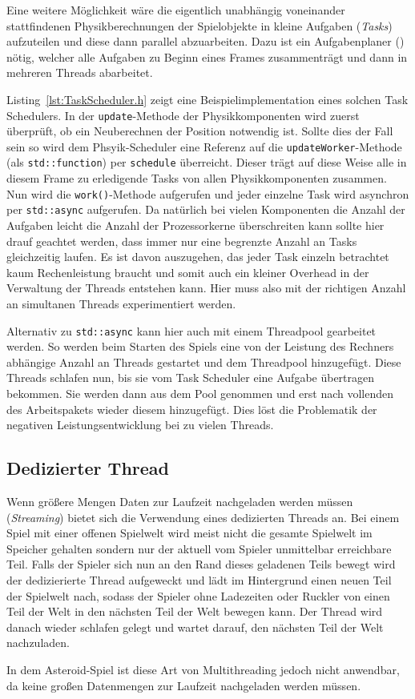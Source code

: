 \documentclass[12pt, a4paper, titlepage, hidelinks]{scrreprt}
\begin{document}
Eine weitere Möglichkeit wäre die eigentlich unabhängig voneinander stattfindenen Physikberechnungen der Spielobjekte in kleine Aufgaben (\textit{Tasks}) aufzuteilen und diese dann parallel abzuarbeiten. Dazu ist ein Aufgabenplaner () nötig, welcher alle Aufgaben zu Beginn eines Frames zusammenträgt und dann in mehreren Threads abarbeitet.

Listing~\autoref{lst:TaskScheduler.h} zeigt eine Beispielimplementation eines solchen Task Schedulers. In der \texttt{update}-Methode der Physikkomponenten wird zuerst überprüft, ob ein Neuberechnen der Position notwendig ist. Sollte dies der Fall sein so wird dem Phsyik-Scheduler eine Referenz auf die \texttt{updateWorker}-Methode (als \texttt{std::function}) per \texttt{schedule} überreicht. Dieser trägt auf diese Weise alle in diesem Frame zu erledigende Tasks von allen Physikkomponenten zusammen. Nun wird die \texttt{work()}-Methode aufgerufen und jeder einzelne Task wird asynchron per \texttt{std::async} aufgerufen. Da natürlich bei vielen Komponenten die Anzahl der Aufgaben leicht die Anzahl der Prozessorkerne überschreiten kann sollte hier drauf geachtet werden, dass immer nur eine begrenzte Anzahl an Tasks gleichzeitig laufen. Es ist davon auszugehen, das jeder Task einzeln betrachtet kaum Rechenleistung braucht und somit auch ein kleiner Overhead in der Verwaltung der Threads entstehen kann. Hier muss also mit der richtigen Anzahl an simultanen Threads experimentiert werden.

Alternativ zu \texttt{std::async} kann hier auch mit einem Threadpool gearbeitet werden. So werden beim Starten des Spiels eine von der Leistung des Rechners abhängige Anzahl an Threads gestartet und dem Threadpool hinzugefügt. Diese Threads schlafen nun, bis sie vom Task Scheduler eine Aufgabe übertragen bekommen. Sie werden dann aus dem Pool genommen und erst nach vollenden des Arbeitspakets wieder diesem hinzugefügt. Dies löst die Problematik der negativen Leistungsentwicklung bei zu vielen Threads.


\subsection{Dedizierter Thread}
Wenn größere Mengen Daten zur Laufzeit nachgeladen werden müssen (\textit{Streaming}) bietet sich die Verwendung eines dedizierten Threads an. Bei einem Spiel mit einer offenen Spielwelt wird meist nicht die gesamte Spielwelt im Speicher gehalten sondern nur der aktuell vom Spieler unmittelbar erreichbare Teil. Falls der Spieler sich nun an den Rand dieses geladenen Teils bewegt wird der dedizierierte Thread aufgeweckt und lädt im Hintergrund einen neuen Teil der Spielwelt nach, sodass der Spieler ohne Ladezeiten oder Ruckler von einen Teil der Welt in den nächsten Teil der Welt bewegen kann. Der Thread wird danach wieder schlafen gelegt und wartet darauf, den nächsten Teil der Welt nachzuladen.

In dem Asteroid-Spiel ist diese Art von Multithreading jedoch nicht anwendbar, da keine großen Datenmengen zur Laufzeit nachgeladen werden müssen.
\end{document}
